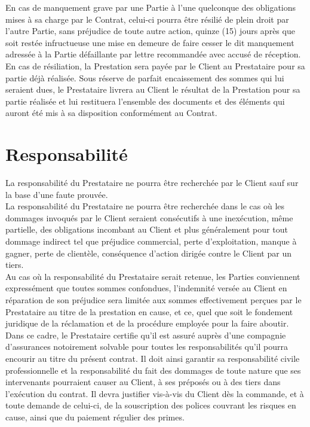 \documentclass[9pt,french]{base}
\begin{document}
\begin{multicols*}{3}
En cas de manquement grave par une Partie à l’une quelconque des obligations mises à sa charge par le Contrat, celui-ci pourra être résilié de plein droit par l’autre Partie, sans préjudice de toute autre action, quinze (15) jours après que soit restée infructueuse une mise en demeure de faire cesser le dit manquement adressée à la Partie défaillante par lettre recommandée avec accusé de réception. \\
En cas de résiliation, la Prestation sera payée par le Client au Prestataire pour sa partie déjà réalisée. Sous réserve de parfait encaissement des sommes qui lui seraient dues, le Prestataire livrera au Client le résultat de la Prestation pour sa partie réalisée et lui restituera l’ensemble des documents et des éléments qui auront été mis à sa disposition conformément au Contrat.

\section{Responsabilité}

La responsabilité du Prestataire ne pourra être recherchée par le Client sauf sur la base d’une faute prouvée. \\
La responsabilité du Prestataire ne pourra être recherchée dans le cas où les dommages invoqués par le Client seraient consécutifs à une inexécution, même partielle, des obligations incombant au Client et plus généralement pour tout dommage indirect tel que préjudice commercial, perte d’exploitation, manque à gagner, perte de clientèle, conséquence d’action dirigée contre le Client par un tiers. \\
Au cas où la responsabilité du Prestataire serait retenue, les Parties conviennent expressément que toutes sommes confondues, l’indemnité versée au Client en réparation de son préjudice sera limitée aux sommes effectivement perçues par le Prestataire au titre de la prestation en cause, et ce, quel que soit le fondement juridique de la réclamation et de la procédure employée pour la faire aboutir. \\
Dans ce cadre, le Prestataire certifie qu’il est assuré auprès d’une compagnie d’assurances notoirement solvable pour toutes les responsabilités qu’il pourra encourir au titre du présent contrat. Il doit ainsi garantir sa responsabilité civile professionnelle et la responsabilité du fait des dommages de toute nature que ses intervenants pourraient causer au Client, à ses préposés ou à des tiers dans l’exécution du contrat. Il devra justifier vis-à-vis du Client dès la commande, et à toute demande de celui-ci, de la souscription des polices couvrant les risques en cause, ainsi que du paiement régulier des primes.


\end{multicols*}
\end{document}
